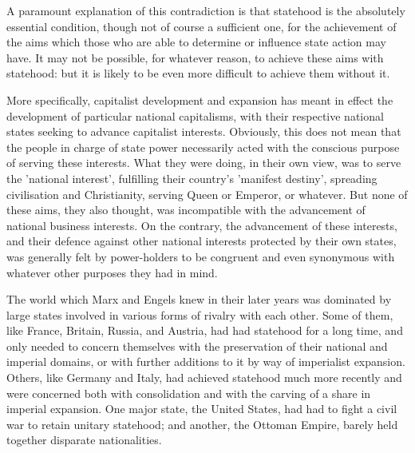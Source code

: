 A paramount explanation of this contradiction is that statehood is the absolutely essential condition, though not of course a sufficient one, for the achievement of the aims which those who are able to determine or influence state action may have. It may not be possible, for whatever reason, to achieve these aims with statehood: but it is likely to be even more difficult to achieve them without it.

More specifically, capitalist development and expansion has meant in effect the development of particular national capitalisms, with their respective national states seeking to advance capitalist interests. Obviously, this does not mean that the people in charge of state power necessarily acted with the conscious purpose of serving these interests. What they were doing, in their own view, was to serve the 'national interest', fulfilling their country's 'manifest destiny', spreading civilisation and Christianity, serving Queen or Emperor, or whatever. But none of these aims, they also thought, was incompatible with the advancement of national business interests. On the contrary, the advancement of these interests, and their defence against other national interests protected by their own states, was generally felt by power-holders to be congruent and even synonymous with whatever other purposes they had in mind.

The world which Marx and Engels knew in their later years was dominated by large states involved in various forms of rivalry with each other. Some of them, like France, Britain, Russia, and Austria, had had statehood for a long time, and only needed to concern themselves with the preservation of their national and imperial domains, or with further additions to it by way of imperialist expansion. Others, like Germany and Italy, had achieved statehood much more recently and were concerned both with consolidation and with the carving of a share in imperial expansion. One major state, the United States, had had to fight a civil war to retain unitary statehood; and another, the Ottoman Empire, barely held together disparate nationalities.

